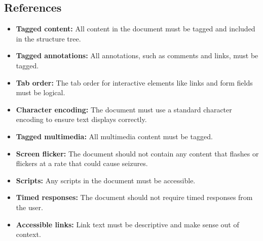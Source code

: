 \subsection{References}
\label{subsec:pdf-references}

\begin{itemize}
	\item \textbf{Tagged content:} All content in the document must be tagged and included in the structure tree.
	\item \textbf{Tagged annotations:} All annotations, such as comments and links, must be tagged.
	\item \textbf{Tab order:} The tab order for interactive elements like links and form fields must be logical.
	\item \textbf{Character encoding:} The document must use a standard character encoding to ensure text displays correctly.
	\item \textbf{Tagged multimedia:} All multimedia content must be tagged.
	\item \textbf{Screen flicker:} The document should not contain any content that flashes or flickers at a rate that could cause seizures.
	\item \textbf{Scripts:} Any scripts in the document must be accessible.
	\item \textbf{Timed responses:} The document should not require timed responses from the user.
	\item \textbf{Accessible links:} Link text must be descriptive and make sense out of context.
\end{itemize}

